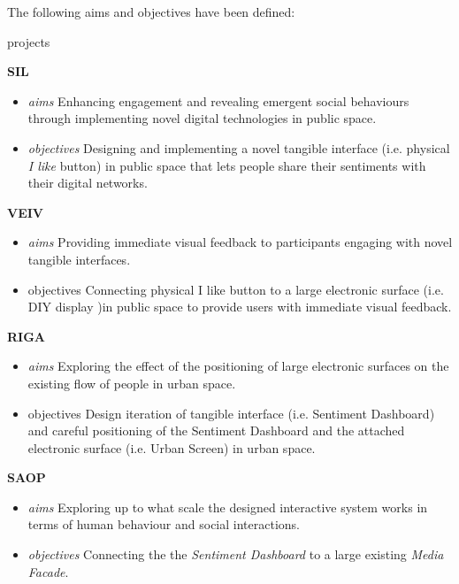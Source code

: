 
The following aims and objectives have been defined:

\begin{singlespace}{

\begin{labeling}{projects}

\item [\textbf{SIL}] 
\begin {itemize} 
\footnotesize
\item [\textit{aims}] Enhancing engagement and revealing emergent social behaviours through implementing novel digital technologies in public space. 
\item [\textit{objectives}] Designing and implementing a novel tangible interface (i.e. physical \textit{I like} button) in public space that lets people share their sentiments with their digital networks.

\end{itemize}

\item [\textbf{VEIV}] 
\begin {itemize}
\footnotesize
\item [\textit{aims}] Providing immediate visual feedback to participants engaging with novel tangible interfaces.
\item [{objectives}] Connecting physical {I like} button to a large electronic surface (i.e. {DIY display} )in public space to provide users with immediate visual feedback.
\end{itemize}

\item [\textbf{RIGA}] 
\begin {itemize}
\footnotesize
\item [\textit{aims}] Exploring the effect of the positioning of large electronic surfaces on the existing flow of people in urban space.
\item [{objectives}] Design iteration of tangible interface (i.e. {Sentiment Dashboard}) and careful positioning of the {Sentiment Dashboard} and the attached electronic surface (i.e. {Urban Screen}) in urban space.
\end{itemize}

\item [\textbf{SAOP}]
\begin {itemize}
\footnotesize
\item [\textit{aims}] Exploring up to what scale the designed interactive system works in terms of human behaviour and social interactions.
\item [\textit{objectives}] Connecting the the \textit{Sentiment Dashboard} to a large existing \textit{Media Facade}. 
\end{itemize}
 

\end{labeling}}
\end{singlespace}
